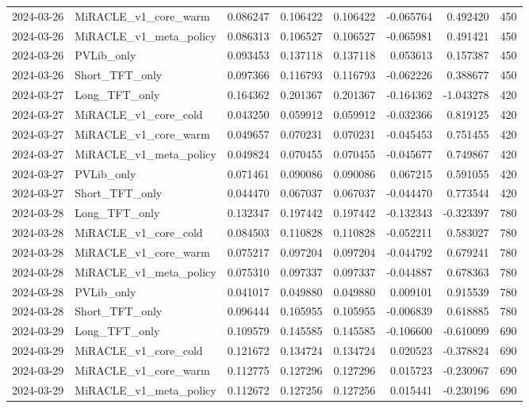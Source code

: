 \begin{tabular}{llrrrrrr}
2024-03-26 & MiRACLE_v1_core_warm & 0.086247 & 0.106422 & 0.106422 & -0.065764 & 0.492420 & 450 \\
2024-03-26 & MiRACLE_v1_meta_policy & 0.086313 & 0.106527 & 0.106527 & -0.065981 & 0.491421 & 450 \\
2024-03-26 & PVLib_only & 0.093453 & 0.137118 & 0.137118 & 0.053613 & 0.157387 & 450 \\
2024-03-26 & Short_TFT_only & 0.097366 & 0.116793 & 0.116793 & -0.062226 & 0.388677 & 450 \\
2024-03-27 & Long_TFT_only & 0.164362 & 0.201367 & 0.201367 & -0.164362 & -1.043278 & 420 \\
2024-03-27 & MiRACLE_v1_core_cold & 0.043250 & 0.059912 & 0.059912 & -0.032366 & 0.819125 & 420 \\
2024-03-27 & MiRACLE_v1_core_warm & 0.049657 & 0.070231 & 0.070231 & -0.045453 & 0.751455 & 420 \\
2024-03-27 & MiRACLE_v1_meta_policy & 0.049824 & 0.070455 & 0.070455 & -0.045677 & 0.749867 & 420 \\
2024-03-27 & PVLib_only & 0.071461 & 0.090086 & 0.090086 & 0.067215 & 0.591055 & 420 \\
2024-03-27 & Short_TFT_only & 0.044470 & 0.067037 & 0.067037 & -0.044470 & 0.773544 & 420 \\
2024-03-28 & Long_TFT_only & 0.132347 & 0.197442 & 0.197442 & -0.132343 & -0.323397 & 780 \\
2024-03-28 & MiRACLE_v1_core_cold & 0.084503 & 0.110828 & 0.110828 & -0.052211 & 0.583027 & 780 \\
2024-03-28 & MiRACLE_v1_core_warm & 0.075217 & 0.097204 & 0.097204 & -0.044792 & 0.679241 & 780 \\
2024-03-28 & MiRACLE_v1_meta_policy & 0.075310 & 0.097337 & 0.097337 & -0.044887 & 0.678363 & 780 \\
2024-03-28 & PVLib_only & 0.041017 & 0.049880 & 0.049880 & 0.009101 & 0.915539 & 780 \\
2024-03-28 & Short_TFT_only & 0.096444 & 0.105955 & 0.105955 & -0.006839 & 0.618885 & 780 \\
2024-03-29 & Long_TFT_only & 0.109579 & 0.145585 & 0.145585 & -0.106600 & -0.610099 & 690 \\
2024-03-29 & MiRACLE_v1_core_cold & 0.121672 & 0.134724 & 0.134724 & 0.020523 & -0.378824 & 690 \\
2024-03-29 & MiRACLE_v1_core_warm & 0.112775 & 0.127296 & 0.127296 & 0.015723 & -0.230967 & 690 \\
2024-03-29 & MiRACLE_v1_meta_policy & 0.112672 & 0.127256 & 0.127256 & 0.015441 & -0.230196 & 690 \\

\end{tabular}
